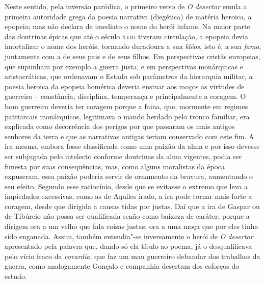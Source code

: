Neste sentido, pela inversão paródica, o primeiro verso de \textit{O desertor}
emula a primeira autoridade grega da poesia narrativa (diegética) de
matéria heroica, a epopeia; mas não declara de imediato o nome do herói infame.
Na maior parte das doutrinas épicas que até o século \textsc{xviii} tiveram
circulação, a epopeia devia imortalizar o nome dos heróis, tornando duradoura a
sua \textit{kléos}, isto é, a sua \textit{fama}, juntamente com a de seus pais e
de seus filhos.  Em perspectivas cristãs europeias, que supunham por exemplo a
guerra justa, e em perspectivas monárquicas e aristocráticas, que ordenavam o
Estado sob parâmetros da hierarquia militar, a poesia heroica da epopeia
homérica deveria ensinar aos moços as virtudes de guerreiro -- constância,
disciplina, temperança e principalmente a coragem.  O bom guerreiro deveria ter
coragem porque a fama, que, mormente em regimes patriarcais monárquicos,
legitimava o mando herdado pelo tronco familiar, era explicada como decorrência
dos perigos por que passaram os mais antigos senhores da terra e que as
narrativas antigas teriam conservado com este fim. A ira mesma, embora fosse
classificada como uma paixão da alma e por isso devesse ser subjugada pelo
intelecto conforme doutrinas da alma vigentes, podia ser funesta por suas
consequências, mas, como alguns moralistas da época expuseram, essa paixão
poderia servir de ornamento da bravura, aumentando o seu efeito. Segundo esse
raciocínio,  desde que se evitasse o extremo que leva a impiedades excessivas,
como as de Aquiles irado, a ira pode tornar mais forte a coragem, desde que
dirigida a causas tidas por justas.  Daí que a ira de Gaspar ou de Tibúrcio não
possa ser qualificada senão como baixeza de caráter, porque a dirigem ora a um
velho que fala coisas justas, ora a uma moça que por eles tinha sido enganada.
Assim, também entendia"-se inversamente o herói de \textit{O desertor}
apresentado pela palavra que, dando só ela título ao poema, já o desqualificava
pelo vício fraco da \textit{covardia}, que faz um mau guerreiro debandar dos
trabalhos da guerra, como analogamente Gonçalo e companhia desertam dos esforços
do estudo.

